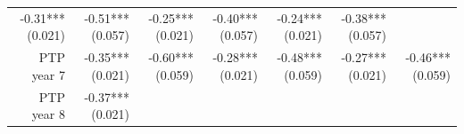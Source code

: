 \documentclass[]{article}
\begin{document}
\begin{longtable}[c]{@{}rrrrrrr@{}}
\begin{minipage}[t]{0.11\columnwidth}
-0.31*** (0.021)
\strut\end{minipage} &
\begin{minipage}[t]{0.12\columnwidth}\raggedleft\strut
-0.51*** (0.057)
\strut\end{minipage} &
\begin{minipage}[t]{0.11\columnwidth}\raggedleft\strut
-0.25*** (0.021)
\strut\end{minipage} &
\begin{minipage}[t]{0.12\columnwidth}\raggedleft\strut
-0.40*** (0.057)
\strut\end{minipage} &
\begin{minipage}[t]{0.11\columnwidth}\raggedleft\strut
-0.24*** (0.021)
\strut\end{minipage} &
\begin{minipage}[t]{0.11\columnwidth}\raggedleft\strut
-0.38*** (0.057)
\strut\end{minipage}\tabularnewline
\begin{minipage}[t]{0.12\columnwidth}\raggedleft\strut
PTP year 7
\strut\end{minipage} &
\begin{minipage}[t]{0.11\columnwidth}\raggedleft\strut
-0.35*** (0.021)
\strut\end{minipage} &
\begin{minipage}[t]{0.12\columnwidth}\raggedleft\strut
-0.60*** (0.059)
\strut\end{minipage} &
\begin{minipage}[t]{0.11\columnwidth}\raggedleft\strut
-0.28*** (0.021)
\strut\end{minipage} &
\begin{minipage}[t]{0.12\columnwidth}\raggedleft\strut
-0.48*** (0.059)
\strut\end{minipage} &
\begin{minipage}[t]{0.11\columnwidth}\raggedleft\strut
-0.27*** (0.021)
\strut\end{minipage} &
\begin{minipage}[t]{0.11\columnwidth}\raggedleft\strut
-0.46*** (0.059)
\strut\end{minipage}\tabularnewline
\begin{minipage}[t]{0.12\columnwidth}\raggedleft\strut
PTP year 8
\strut\end{minipage} &
\begin{minipage}[t]{0.11\columnwidth}\raggedleft\strut
-0.37*** (0.021)
\strut\end{minipage} &
\begin{minipage}[t]{0.12\columnwidth}\raggedleft\strut

\end{minipage}
\end{longtable}
\end{document}
